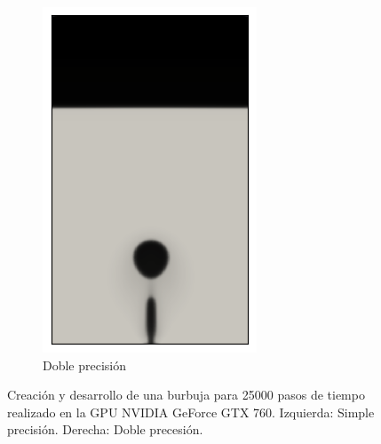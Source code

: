 \begin{figure}[H]
\begin{subfigure}{0.35\textwidth}
	\includegraphics[width=\linewidth]{figs/cap4/cuda_bb_760_d25}
	\caption{Doble precisión}
	\label{fig:bb_dp_760}\hfil
	\end{subfigure}

\caption{Creación y desarrollo de una burbuja para 25000 pasos de tiempo realizado en la GPU NVIDIA GeForce GTX 760. Izquierda: Simple precisión. Derecha: Doble precesión.}
\label{fig:bb_simple_doble_760}
\end{figure}

